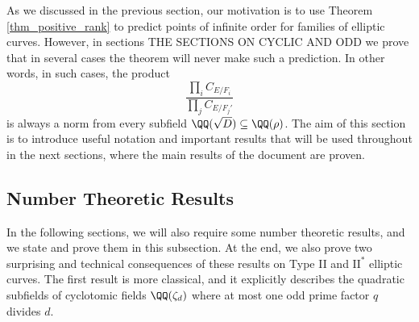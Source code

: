 As we discussed in the previous section, our motivation is to use Theorem \ref{thm_positive_rank} to predict points of infinite order for families of elliptic curves. However, in sections {\color{red} THE SECTIONS ON CYCLIC AND ODD} we prove that in several cases the theorem will never make such a prediction. In other words, in such cases, the product
\begin{equation}\label{eqn_localprod}
    \frac{\prod_i C_{E/F_i}}{\prod_j C_{E/F_j'}}
\end{equation}
is always a norm from every subfield $\QQ(\sqrt{D})\subseteq\QQ(\rho)$. The aim of this section is to introduce useful notation and important results that will be used throughout in the next sections, where the main results of the document are proven. 



\subsection{Number Theoretic Results}

In the following sections, we will also require some number theoretic results, and we state and prove them in this subsection. At the end, we also prove two surprising and technical consequences of these results on Type II and $\mathrm{II^*}$ elliptic curves. The first result is more classical, and it explicitly describes the quadratic subfields of cyclotomic fields $\QQ(\zeta_d)$ where at most one odd prime factor $q$ divides $d$.

